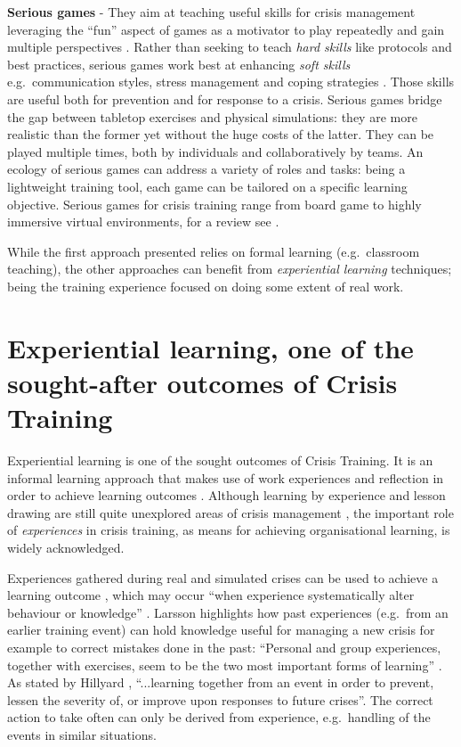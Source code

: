 \textbf{Serious games} - They aim at teaching useful skills for crisis management leveraging the ``fun'' aspect of games as a motivator to play repeatedly and gain multiple perspectives \autocite{DiLoreto:2012bj}. Rather than seeking to teach \emph{hard skills} like protocols and best practices, serious games work best at enhancing \emph{soft skills} e.g.~communication styles, stress management and coping strategies \autocite{Sagun:2009ks}. Those skills are useful both for prevention and for response to a crisis. Serious games bridge the gap between tabletop exercises and physical simulations: they are more realistic than the former yet without the huge costs of the latter. They can be played multiple times, both by individuals and collaboratively by teams. An ecology of serious games can address a variety of roles and tasks: being a lightweight training tool, each game can be tailored on a specific learning objective. Serious games for crisis training range from board game to highly immersive virtual environments, for a review see \autocite{DiLoreto:2012bj}.

While the first approach presented relies on formal learning (e.g.~classroom teaching), the other approaches can benefit from \emph{experiential learning} \autocite{kolb1984organizational} techniques; being the training experience focused on doing some extent of real work.

\section{Experiential learning, one of the sought-after outcomes of Crisis Training}\label{experiential-learning-one-of-the-sought-after-outcomes-of-crisis-training}

Experiential learning is one of the sought outcomes of Crisis Training. It is an informal learning approach that makes use of work experiences and reflection in order to achieve learning outcomes \autocite{kolb1984organizational}. Although learning by experience and lesson drawing are still quite unexplored areas of crisis management \autocites{Lagadec:1997js}{Boin:2007wt}{Stern:1997eb}, the important role of \emph{experiences} in crisis training, as means for achieving organisational learning, is widely acknowledged.

Experiences gathered during real and simulated crises can be used to achieve a learning outcome \autocite{Deverell:2009fk}, which may occur ``when experience systematically alter behaviour or knowledge'' \autocite[p.233]{Schwab:2007iw}. Larsson \autocite{Larsson:2010jr} highlights how past experiences (e.g.~from an earlier training event) can hold knowledge useful for managing a new crisis for example to correct mistakes done in the past: ``Personal and group experiences, together with exercises, seem to be the two most important forms of learning'' \autocite[p.714]{Larsson:2010jr}. As stated by Hillyard \autocite*{Hillyard:SYlJRQLN}, ``...learning together from an event in order to prevent, lessen the severity of, or improve upon responses to future crises''. The correct action to take often can only be derived from experience, e.g.~handling of the events in similar situations.

